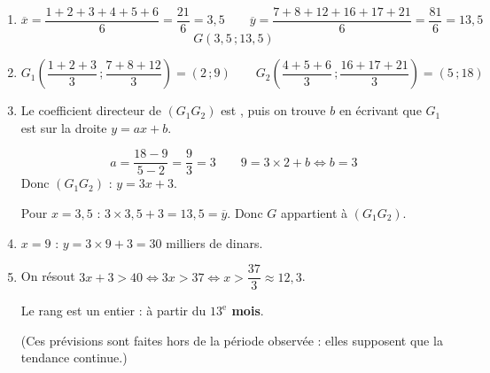 \begin{enumerate}[itemsep=14pt]
  \item
  \begin{center}
  \end{center}
  \[\overline x=\dfrac{1+2+3+4+5+6}{6}=\dfrac{21}{6}=3{,}5\qquad\overline y=\dfrac{7+8+12+16+17+21}{6}=\dfrac{81}{6}=13{,}5\]
  \[G(3{,}5\,;13{,}5)\]

  \item
  \[G_1\left(\dfrac{1+2+3}{3}\,;\dfrac{7+8+12}{3}\right)=(2\,;9)\qquad G_2\left(\dfrac{4+5+6}{3}\,;\dfrac{16+17+21}{3}\right)=(5\,;18)\]

  \item
  \begin{prop}
  Le coefficient directeur de $(G_1G_2)$ est , puis on trouve $b$ en écrivant que $G_1$ est sur la droite $y=ax+b$.
  \end{prop}
  \[a=\dfrac{18-9}{5-2}=\dfrac93=3\qquad9=3\times2+b\iff b=3\]
  Donc $(G_1G_2)$ : $y=3x+3$.

  Pour $x=3{,}5$ : $3\times3{,}5+3=13{,}5=\overline y$. Donc $G$ appartient à $(G_1G_2)$.

  \item $x=9$ : $y=3\times9+3=30$ milliers de dinars.

  \item On résout $3x+3>40\iff3x>37\iff x>\dfrac{37}{3}\approx12{,}3$.

  Le rang est un entier : à partir du \textbf{$13^{\text{e}}$ mois}.

  (Ces prévisions sont faites hors de la période observée : elles supposent que la tendance continue.)
\end{enumerate}
